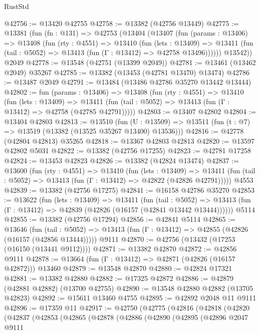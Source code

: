 \begin{lexlean}{RustStd}
\begin{coremodule}
@42756 := @13420 @42755
@42758 := @13382 (@42756 @13449)
@42775 := @13381
    (fun (fn : @131) =>
    @42753
      (@13404
        (@13407
          (fun (params : @13406) =>
          @13408
            (fun (rty : @4551) =>
            @13410
              (fun (lets : @13409) =>
              @13411 (fun (tail : @5052) => @13413 (fun (Γ : @13412) => @42758 @13496))))))
        @13542))
    @2049
@42778 := @13548 (@42751 (@13399 @2049))
@42781 := @13461 (@13462 @2049) @35267
@42785 := @13382 (@13453 (@42781 @13470) @13474)
@42786 := @13487 @2049
@42791 := @13484 (@13486 @42786 @35270 @13442 @13444)
@42802 := fun (params : @13406) =>
  @13408
    (fun (rty : @4551) =>
    @13410
      (fun (lets : @13409) =>
      @13411 (fun (tail : @5052) => @13413 (fun (Γ : @13412) => @42758 (@42785 @42791)))))
@42803 := @13407 @42802
@42804 := @13404 @42803
@42813 := @13510
    (fun (U : @13509) => @13511 (fun (t : @7) => @13519 (@13382 (@13525 @35267 @13400) @13536)))
@42816 := @42778 (@42804 @42813) @35265
@42818 := @13367 @42803 @42813
@42820 := @13597 @42802 @5031
@42822 := @13382 (@42756 @17255)
@42823 := @42781 @17258
@42824 := @13453 @42823
@42826 := @13382 (@42824 @13474)
@42837 := @13600
    (fun (rty : @4551) =>
    @13410
      (fun (lets : @13409) =>
      @13411 (fun (tail : @5052) => @13413 (fun (Γ : @13412) => @42822 (@42826 @42791)))))
    @4553
@42839 := @13382 (@42756 @17275)
@42841 := @16158 @42786 @35270
@42853 := @13622
    (fun (lets : @13409) =>
    @13411
      (fun (tail : @5052) =>
      @13413 (fun (Γ : @13412) => @42839 (@42826 (@16157 (@42841 @13442 @13444))))))
    @5114
@42855 := @13382 (@42756 @17294)
@42856 := @42841 @5114
@42865 := @13646
    (fun (tail : @5052) => @13413 (fun (Γ : @13412) => @42855 (@42826 (@16157 (@42856 @13444)))))
    @9111
@42870 := @42756 (@13432 (@17253 (@16150 (@13441 @9112))))
@42871 := @13382 @42870
@42872 := @42856 @9111
@42878 := @13664 (fun (Γ : @13412) => @42871 (@42826 (@16157 @42872))) @13460
@42879 := @13548 @42870
@42880 := @42824 @17321
@42881 := @13382 @42880
@42882 := @17325 @42872
@42886 := @42879 (@42881 @42882) (@13700 @42755)
@42890 := @13548 @42880 @42882 (@13705 @42823)
@42892 := @15611 @13460 @4755
@42895 := @42892 @2048 @11 @9111
@42896 := @17359 @11
@42917 := @42750
    (@42775
      (@42816
        (@42818
          (@42820
            (@42837
              (@42853
                (@42865
                  (@42878
                    (@42886
                      (@42890
                        (@42895
                          (@42896
                            @2047
                            @9111

\end{coremodule}
\end{lexlean}
